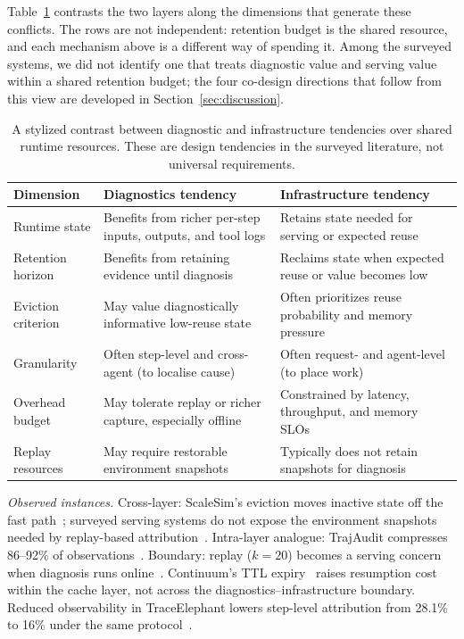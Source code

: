 Table~\ref{tab:tension} contrasts the two layers along the dimensions that generate these conflicts. The rows are not independent: retention budget is the shared resource, and each mechanism above is a different way of spending it. Among the surveyed systems, we did not identify one that treats diagnostic value and serving value within a shared retention budget; the four co-design directions that follow from this view are developed in Section~\ref{sec:discussion}.

\begin{table}[t]
\centering
\caption{A stylized contrast between diagnostic and infrastructure tendencies over shared runtime resources. These are design tendencies in the surveyed literature, not universal requirements.}
\label{tab:tension}
\footnotesize
\setlength{\tabcolsep}{5pt}
\begin{tabular}{@{}p{}p{}p{}@{}}
\toprule
\textbf{Dimension} & \textbf{Diagnostics tendency} & \textbf{Infrastructure tendency} \\
\midrule
Runtime state & Benefits from richer per-step inputs, outputs, and tool logs & Retains state needed for serving or expected reuse \\
Retention horizon & Benefits from retaining evidence until diagnosis & Reclaims state when expected reuse or value becomes low \\
Eviction criterion & May value diagnostically informative low-reuse state & Often prioritizes reuse probability and memory pressure \\
Granularity & Often step-level and cross-agent (to localise cause) & Often request- and agent-level (to place work) \\
Overhead budget & May tolerate replay or richer capture, especially offline & Constrained by latency, throughput, and memory SLOs \\
Replay resources & May require restorable environment snapshots & Typically does not retain snapshots for diagnosis \\
\bottomrule
\end{tabular}
\end{table}
\vspace{-2pt}
{\footnotesize \emph{Observed instances.} Cross-layer: ScaleSim's eviction moves inactive state off the fast path~\cite{zhou2026}; surveyed serving systems do not expose the environment snapshots needed by replay-based attribution~\cite{famas2025,dover2026}. Intra-layer analogue: TrajAudit compresses 86--92\% of observations~\cite{trajaudit2026}. Boundary: replay ($k{=}20$) becomes a serving concern when diagnosis runs online~\cite{famas2025}. Continuum's TTL expiry~\cite{continuum2025} raises resumption cost within the cache layer, not across the diagnostics--infrastructure boundary. Reduced observability in TraceElephant lowers step-level attribution from 28.1\% to 16\% under the same protocol~\cite{traceelephant2026}.}
